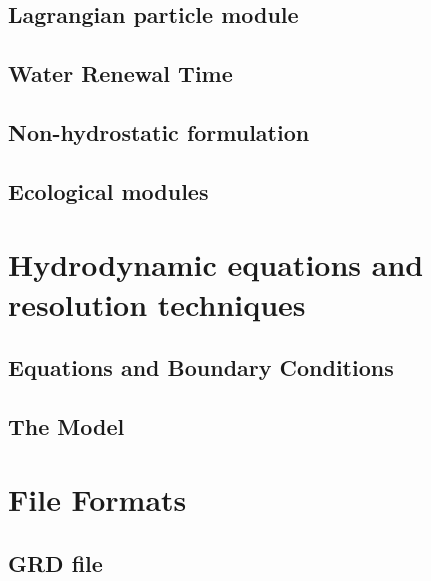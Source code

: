 \documentclass{report}
\begin{document}
	\section{Lagrangian particle module}
	


	\section{Water Renewal Time}
	

	\section{Non-hydrostatic formulation}
	

      \section{Ecological modules}
	\label{eco}
	



\appendix
\chapter{Hydrodynamic equations and resolution techniques}

      \section{Equations and Boundary Conditions}
	

	\section{The Model}
	

\chapter{File Formats}
	\section{GRD file}
	
\end{document}
